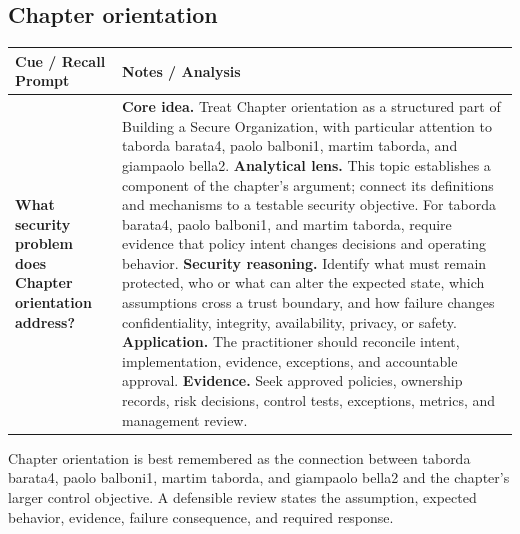 \documentclass[11pt]{article}
\newcommand{\CornellHeader}{%
\rowcolor{Navy}\color{white}\bfseries Cue / Recall Prompt & \color{white}\bfseries Notes / Analysis\\\hline}
\newcommand{\CornellRow}[2]{%
\cellcolor{CueGray}\RaggedRight\textbf{#1} & \RaggedRight #2\\\hline}
\begin{document}
\subsection*{Chapter orientation}
\begin{longtable}{>{\RaggedRight\arraybackslash}p{}|>{\RaggedRight\arraybackslash}p{}}
\CornellHeader
\CornellRow{What security problem does Chapter orientation address?}{\textbf{Core idea.} Treat Chapter orientation as a structured part of Building a Secure Organization, with particular attention to taborda barata4, paolo balboni1, martim taborda, and giampaolo bella2. \textbf{Analytical lens.} This topic establishes a component of the chapter's argument; connect its definitions and mechanisms to a testable security objective. For taborda barata4, paolo balboni1, and martim taborda, require evidence that policy intent changes decisions and operating behavior. \textbf{Security reasoning.} Identify what must remain protected, who or what can alter the expected state, which assumptions cross a trust boundary, and how failure changes confidentiality, integrity, availability, privacy, or safety. \textbf{Application.} The practitioner should reconcile intent, implementation, evidence, exceptions, and accountable approval. \textbf{Evidence.} Seek approved policies, ownership records, risk decisions, control tests, exceptions, metrics, and management review.}
\end{longtable}
\begin{topicsummary}
Chapter orientation is best remembered as the connection between taborda barata4, paolo balboni1, martim taborda, and giampaolo bella2 and the chapter's larger control objective. A defensible review states the assumption, expected behavior, evidence, failure consequence, and required response.
\end{topicsummary}
\end{document}
